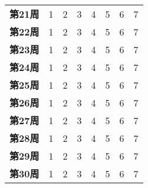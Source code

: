 \begin{longtable}[c]{c*{7}{r}}
    \textbf{第21周}  & 1 & 2 & 3 & 4 & 5 & 6 & 7 \\
    \textbf{第22周}  & 1 & 2 & 3 & 4 & 5 & 6 & 7 \\
    \textbf{第23周}  & 1 & 2 & 3 & 4 & 5 & 6 & 7 \\
    \textbf{第24周}  & 1 & 2 & 3 & 4 & 5 & 6 & 7 \\
    \textbf{第25周}  & 1 & 2 & 3 & 4 & 5 & 6 & 7 \\
    \textbf{第26周}  & 1 & 2 & 3 & 4 & 5 & 6 & 7 \\
    \textbf{第27周}  & 1 & 2 & 3 & 4 & 5 & 6 & 7 \\
    \textbf{第28周}  & 1 & 2 & 3 & 4 & 5 & 6 & 7 \\
    \textbf{第29周}  & 1 & 2 & 3 & 4 & 5 & 6 & 7 \\ 
    \textbf{第30周}  & 1 & 2 & 3 & 4 & 5 & 6 & 7 \\ 
    \bottomrule
\end{longtable}
